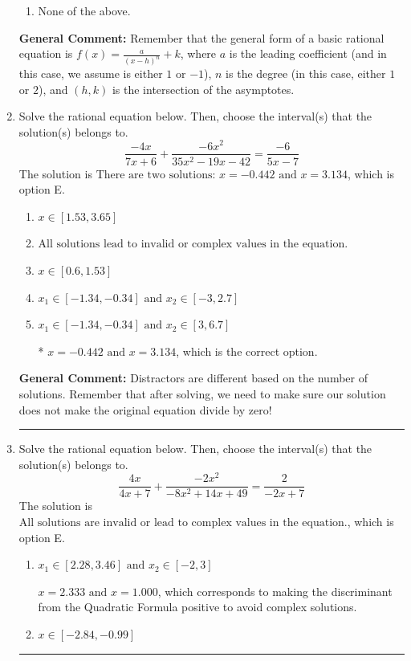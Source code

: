 \documentclass{extbook}[14pt]
\newcommand{\litem}[1]{\item #1

\rule{\textwidth}{0.4pt}}
\begin{document}
\begin{enumerate}
{\begin{enumerate}[label=\Alph*.]
\begin{multicols}{2}
\end{multicols}\item None of the above.\end{enumerate}
\textbf{General Comment:} Remember that the general form of a basic rational equation is $ f(x) = \frac{a}{(x-h)^n} + k$, where $a$ is the leading coefficient (and in this case, we assume is either $1$ or $-1$), $n$ is the degree (in this case, either $1$ or $2$), and $(h, k)$ is the intersection of the asymptotes.
}
\litem{
Solve the rational equation below. Then, choose the interval(s) that the solution(s) belongs to.
\[ \frac{-4x}{7x + 6} + \frac{-6x^{2}}{35x^{2} -19 x -42} = \frac{-6}{5x -7} \]The solution is \( \text{There are two solutions: } x = -0.442 \text{ and } x = 3.134 \), which is option E.\begin{enumerate}[label=\Alph*.]
\item \( x \in [1.53,3.65] \)


\item \( \text{All solutions lead to invalid or complex values in the equation.} \)


\item \( x \in [0.6,1.53] \)


\item \( x_1 \in [-1.34, -0.34] \text{ and } x_2 \in [-3,2.7] \)


\item \( x_1 \in [-1.34, -0.34] \text{ and } x_2 \in [3,6.7] \)

* $x = -0.442 \text{ and } x = 3.134$, which is the correct option.
\end{enumerate}

\textbf{General Comment:} Distractors are different based on the number of solutions. Remember that after solving, we need to make sure our solution does not make the original equation divide by zero!
}
\litem{
Solve the rational equation below. Then, choose the interval(s) that the solution(s) belongs to.
\[ \frac{4x}{4x + 7} + \frac{-2x^{2}}{-8x^{2} +14 x + 49} = \frac{2}{-2x + 7} \]The solution is \( \text{All solutions are invalid or lead to complex values in the equation.} \), which is option E.\begin{enumerate}[label=\Alph*.]
\item \( x_1 \in [2.28, 3.46] \text{ and } x_2 \in [-2,3] \)

$x = 2.333 \text{ and } x = 1.000$, which corresponds to making the discriminant from the Quadratic Formula positive to avoid complex solutions.
\item \( x \in [-2.84,-0.99] \)


\end{enumerate}}
\end{enumerate}
\end{document}
